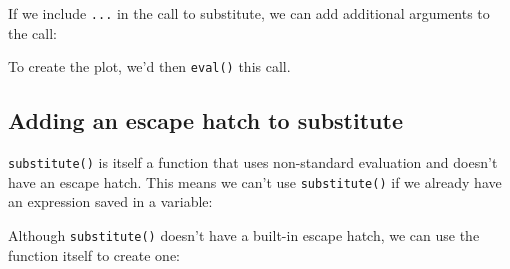 If we include \texttt{...} in the call to substitute, we can add
additional arguments to the call:

\begin{Shaded}
\begin{Highlighting}[]
\StringTok{ }
  \NormalTok{(}\StringTok{ }
\NormalTok{\}}
  \NormalTok{, } \NormalTok{)}
\end{Highlighting}
\end{Shaded}

To create the plot, we'd then \texttt{eval()} this call.

\subsection{Adding an escape hatch to substitute}

\texttt{substitute()} is itself a function that uses non-standard
evaluation and doesn't have an escape hatch. This means we can't use
\texttt{substitute()} if we already have an expression saved in a
variable: 

\begin{Shaded}
\begin{Highlighting}[]
\StringTok{ }\StringTok{ }
\NormalTok{(} \NormalTok{, } \NormalTok{))}
\end{Highlighting}
\end{Shaded}

Although \texttt{substitute()} doesn't have a built-in escape hatch, we
can use the function itself to create one:

\begin{Shaded}
\begin{Highlighting}[]
\StringTok{ }
  \StringTok{ }\NormalTok{(}\NormalTok{(} 
\NormalTok{\}}

\StringTok{ }\StringTok{ }
\NormalTok{(} \NormalTok{, } \NormalTok{))}
\end{Highlighting}
\end{Shaded}

